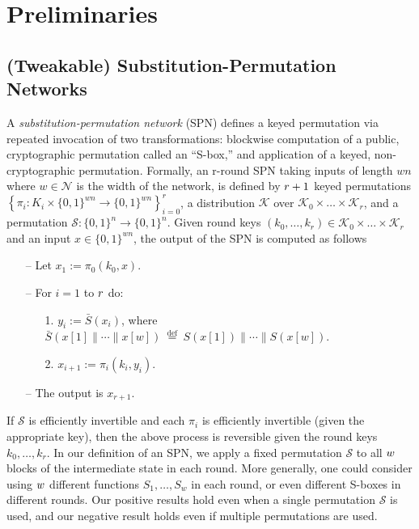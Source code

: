 

\section{Preliminaries}
\label{section:preliminary}



\subsection{(Tweakable) Substitution-Permutation Networks}
A \emph{substitution-permutation network} (SPN) defines a keyed permutation via repeated invocation of two transformations: blockwise computation of a public, cryptographic permutation called an ``S-box,'' and application of a keyed, non-cryptographic permutation. Formally, an r-round SPN taking inputs of length $w n$ where $w \in \mathcal{N}$ is the width of the network, is defined by $\mathnormal{r}+1$ keyed permutations $\left\{\pi_{i}: K_{i} \times\{0,1\}^{w n} \rightarrow\{0,1\}^{w n}\right\}_{i=0}^{r}$, a distribution $\mathcal{K}$ over $\mathcal{K}_{0} \times \dots \times \mathcal{K}_{r}$, and a permutation $\mathcal{S}:\{0,1\}^{n} \rightarrow \{0,1\}^{n}$. Given round keys $(k_{0},\dots, k_{r}) \in \mathcal{K}_{0} \times \dots \times \mathcal{K}_{r}$ and an input $x \in \{0,1\}^{w n}$, the output of the SPN is computed as follows

\begin{itemize}
  \item[--]
  Let $x_{1} := \pi_{0}(k_{0},x)$.
  \item[--]
  For $i = 1$ to $\mathnormal{r}$ do:
  \begin{itemize}
    \item[1.]
    $y_{i} := \bar{S}(x_{i})$, where $\bar{S}(x[1]\|\cdots\| x[w]) \stackrel{\text { def }}{=} S(x[1])\|\cdots\| S(x[w])$.
    \item[2.]
    $x_{i + 1} := \pi_{i}(k_{i},y_{i})$.
  \end{itemize}
  \item[--]
  The output is $x_{r+1}$.
\end{itemize}

If $\mathcal{S}$ is efficiently invertible and each $\pi_{i}$ is efficiently invertible (given the appropriate key), then the above process is reversible given the round keys $k_{0}, \dots ,k_{r}$. In our definition of an SPN, we apply a fixed permutation $\mathcal{S}$ to all $\mathnormal{w}$ blocks of the intermediate state in each round. More generally, one could consider using $\mathnormal{w}$ different functions $S_{1}, \dots ,S_{w}$ in each round, or even different S-boxes in different rounds. Our positive results hold even when a single permutation $\mathcal{S}$ is used, and our negative result holds even if multiple permutations are used.



